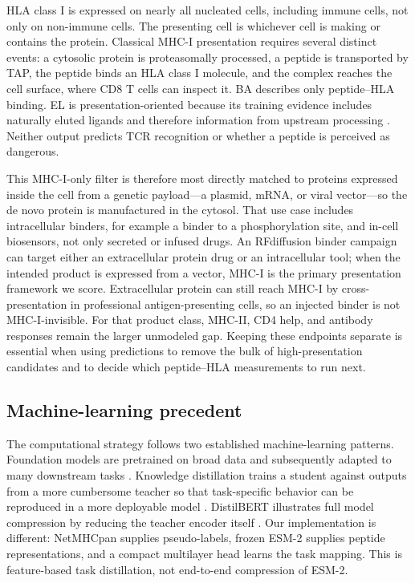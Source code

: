 \documentclass{article}
\begin{document}
HLA class I is expressed on nearly all nucleated cells, including immune cells, not only on non-immune cells. The presenting cell is whichever cell is making or contains the protein. Classical MHC-I presentation requires several distinct events: a cytosolic protein is proteasomally processed, a peptide is transported by TAP, the peptide binds an HLA class I molecule, and the complex reaches the cell surface, where CD8 T cells can inspect it. BA describes only peptide--HLA binding. EL is presentation-oriented because its training evidence includes naturally eluted ligands and therefore information from upstream processing \cite{reynisson2020netmhc}. Neither output predicts TCR recognition or whether a peptide is perceived as dangerous.

This MHC-I-only filter is therefore most directly matched to proteins expressed inside the cell from a genetic payload---a plasmid, mRNA, or viral vector---so the de novo protein is manufactured in the cytosol. That use case includes intracellular binders, for example a binder to a phosphorylation site, and in-cell biosensors, not only secreted or infused drugs. An RFdiffusion binder campaign can target either an extracellular protein drug or an intracellular tool; when the intended product is expressed from a vector, MHC-I is the primary presentation framework we score. Extracellular protein can still reach MHC-I by cross-presentation in professional antigen-presenting cells, so an injected binder is not MHC-I-invisible. For that product class, MHC-II, CD4 help, and antibody responses remain the larger unmodeled gap. Keeping these endpoints separate is essential when using predictions to remove the bulk of high-presentation candidates and to decide which peptide--HLA measurements to run next.

\subsection{Machine-learning precedent}
The computational strategy follows two established machine-learning patterns. Foundation models are pretrained on broad data and subsequently adapted to many downstream tasks \cite{bommasani2021foundation}. Knowledge distillation trains a student against outputs from a more cumbersome teacher so that task-specific behavior can be reproduced in a more deployable model \cite{hinton2015distilling}. DistilBERT illustrates full model compression by reducing the teacher encoder itself \cite{sanh2019distilbert}. Our implementation is different: NetMHCpan supplies pseudo-labels, frozen ESM-2 supplies peptide representations, and a compact multilayer head learns the task mapping. This is feature-based task distillation, not end-to-end compression of ESM-2.
\end{document}
